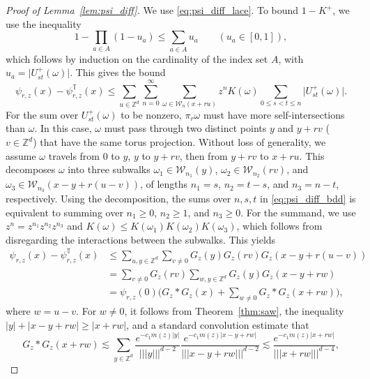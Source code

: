 \documentclass[11pt,hidelinks]{article}
\theoremstyle{plain}
\numberwithin{equation}{section}
\newcommand{\Z}{\mathbb{Z}}
\newcommand{\Wcal}{\mathcal{W}}
\renewcommand{\(}{\left(}
\renewcommand{\)}{\right)}
\newcommand{\1}{\mathds{1}}
\newcommand{\nl}{\nonumber \\}
\providecommand{\abs}[1]{\lvert#1\rvert}
\newcommand{\mz}{m(z)}
\newcommand{\supT}{^{ \mathbb{T} }}
\newcommand{\subrz}{_{r,z}}
\newcommand{\rz}{{r,z}}
\newcommand{\st}{{st}}
\newcommand{\veee}[1]{|\!|\!|#1|\!|\!|}
\providecommand{\nnnorm}[1]{\veee {#1} }
\begin{document}
\begin{proof}[Proof of Lemma~\ref{lem:psi_diff}]
We use \eqref{eq:psi_diff_lace}. 
To bound $1 - K^+$, we use the inequality 
\begin{equation}
1 - \prod_{a\in A} (1 - u_a)	\le \sum_{a\in A} u_a 	\qquad (u_a\in[0,1]),
\end{equation}
which follows by induction on the cardinality of the index set $A$, 
with $u_a = \abs{ U_\st^+(\omega) }$. This gives the bound
\begin{equation}
\label{eq:psi_diff_bdd}
\psi\subrz(x) - \psi\subrz\supT(x) 
\le  \sum_{u\in \Z^d}  \sum_{n=0}^\infty \sum_{\omega \in \Wcal_n(x+ru) } z^n K(\omega) \sum_{0\le s<t \le n} \abs{ U_\st^+(\omega) }  .
\end{equation}
For the sum over $U_\st^+(\omega)$ to be nonzero, $\pi_r\omega$ must have more self-intersections than $\omega$. 
In this case, $\omega$ must pass through two distinct points $y$ and $y+rv$ ($v\in \Z^d$) that have the same torus projection. 
Without loss of generality, we assume $\omega$ travels from $0$ to $y$, $y$ to $y+rv$, then from $y+rv$ to $x+ru$. 
This decomposes $\omega$ into three subwalks $\omega_1 \in \mathcal W_{n_1}(y)$, $\omega_2 \in\mathcal W_{n_2}(rv)$, and $\omega_3 \in \mathcal W_{n_3}(x-y + r(u-v) )$, of lengths $n_1 = s$, $n_2 = t-s$, and $n_3 = n-t$, respectively. 
Using the decomposition, the sums over $n,s,t$ in \eqref{eq:psi_diff_bdd} is equivalent to summing over $n_1 \ge 0$, $n_2 \ge 1$, and $n_3\ge 0$. 
For the summand, we use $z^n = z^{n_1}z^{n_2}z^{n_3}$ and $K(\omega) \le K(\omega_1) K(\omega_2) K(\omega_3)$, which follows from disregarding the interactions between the subwalks. 
This yields 
\begin{align}
\label{eq:psi_diff_bdd_2}
\psi\subrz(x) - \psi\subrz\supT(x) 
&\le \sum_{u,y\in \Z^d}\sum_{v\ne0} G_z(y) G_z(rv) G_z(x-y+r(u-v))\nl
&= \sum_{v\ne0} G_z(rv) \sum_{w,y\in \Z^d} G_z(y) G_z(x-y+rw)  \nl
&= \psi_\rz(0) \Big( G_z * G_z(x) + \sum_{w\ne0} G_z* G_z (x+rw) \Big) ,
\end{align}
where $w=u-v$.
For $w\ne 0$, it follows from Theorem~\ref{thm:saw}, the inequality
$\abs y + \abs{ x-y+rw} \ge \abs{x+rw}$, and a standard convolution estimate \cite[Proposition~1.7(i)]{HHS03} that
\begin{equation}
G_z* G_z (x+rw) \lesssim
\sum_{y\in \Z^d} \frac{ e^{-c_1\mz \abs y} }{ \nnnorm y^{d-2} } 
	\frac{e^{-c_1\mz\abs{x-y+rw}} }{\nnnorm { x -y+rw }^{d-2} }
\lesssim \frac{ e^{-c_1\mz \abs{x+rw} } } { \nnnorm{x+rw}^{d-4} }, 
\end{equation}

\end{proof}
\end{document}
